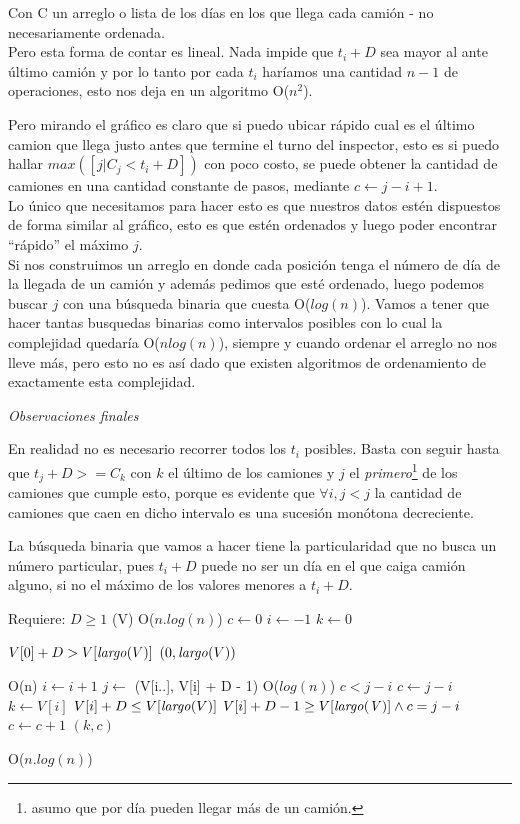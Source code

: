 \documentclass[11pt,a4paper]{article}
\begin{document}
Con C un arreglo o lista de los días en los que llega cada camión - no necesariamente ordenada.\\
Pero esta forma de contar es lineal. Nada impide que $t_i + D$ sea mayor al ante último camión y por lo tanto por cada $t_i$ haríamos una cantidad $n - 1$ de operaciones, esto nos deja en un algoritmo O($n^2$).

Pero mirando el gráfico es claro que si puedo ubicar rápido cual es el último camion que llega justo antes que termine el turno del inspector, esto es si puedo hallar $max([j | C_j < t_i + D])$ con poco costo, se puede obtener la cantidad de camiones en una cantidad constante de pasos, mediante $c \gets j - i + 1$.\\
Lo único que necesitamos para hacer esto es que nuestros datos estén dispuestos de forma similar al gráfico, esto es que estén ordenados y luego poder encontrar ``rápido'' el máximo $j$.\\

Si nos construimos un arreglo en donde cada posición tenga el número de día de la llegada de un camión y además pedimos que esté ordenado, luego podemos buscar $j$ con una búsqueda binaria que cuesta O($log(n)$). Vamos a tener que hacer tantas busquedas binarias como intervalos posibles con lo cual la complejidad quedaría O($nlog(n)$), siempre y cuando ordenar el arreglo no nos lleve más, pero esto no es así dado que existen algoritmos de ordenamiento de exactamente esta complejidad.

\emph{Observaciones finales}

En realidad no es necesario recorrer todos los $t_i$ posibles. 
Basta con seguir hasta que $t_j + D >= C_k$ con $k$ el último de los camiones y $j$ el \emph{primero}\footnote{asumo que por día pueden llegar más de un camión.} de los camiones que cumple esto, porque es evidente que $\forall i, j < j$ la cantidad de camiones que caen en dicho intervalo es una sucesión monótona decreciente.

La búsqueda binaria que vamos a hacer tiene la particularidad que no busca un número particular, pues $t_i + D$ puede no ser un día en el que caiga camión alguno, si no el máximo de los valores menores a $t_i + D$. 

\begin{codebox}
\zi \Comment Requiere: $D \ge 1$ 
\li {}(V) \RComment O($n.log(n)$)
\li $c \gets 0$
\li $i \gets -1$
\li $k \gets 0$

\li \If $V[0] + D > V[\id{largo}(V)]$
\li 	\Then \Return $(0, \id{largo}(V))$
\li	\Else 

\li \Repeat \RComment O(n)
\li 	$i \gets i + 1$
\li	$j \gets $ (V[i..], V[i] + D - 1) \RComment O($log(n)$)
\li	\If $c < j - i$
\li		\Then $c \gets j - i$
\li		      $k \gets V[i]$
	\End
\li \Until $V[i] + D \le V[\id{largo}(V)]$ 
\li	\If $V[i] + D - 1 \ge V[\id{largo(V)}] \wedge c = j - i $
\li		\Then 
\li			$ c \gets c + 1$
		\End
\li \Return $(k, c)$
	\End


\RComment O($n.log(n)$)
\end{codebox}
\end{document}
